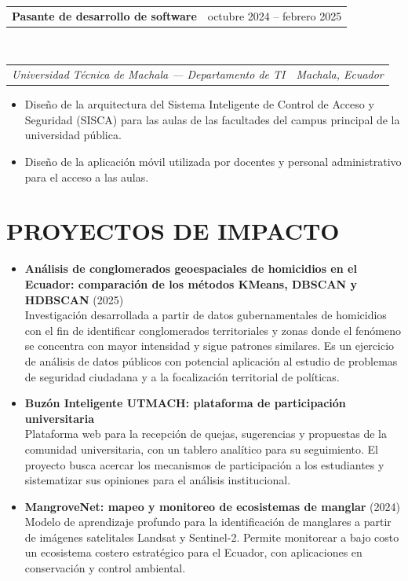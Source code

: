 \documentclass[letterpaper,10pt]{article}
\makeatletter
\newcommand{\fila}[2]{%
  \begin{tabular*}{\textwidth}{@{}l@{\extracolsep{\fill}}r@{}}
    #1 & #2 \\
  \end{tabular*}%
}
\newcommand{\entrada}[4]{%
  \fila{\textbf{#1}}{#2}\\[1pt]
  \fila{\textit{#3}}{\textit{#4}}\vspace{1pt}%
}
\newenvironment{vinetas}
  {\begin{itemize}[leftmargin=1.4em,label=$\bullet$,itemsep=0.5pt,topsep=1pt,parsep=0pt,partopsep=0pt]}
  {\end{itemize}\vspace{1pt}}
\makeatother
\begin{document}
\entrada{Pasante de desarrollo de software}{octubre 2024 -- febrero 2025}
        {Universidad Técnica de Machala --- Departamento de TI}{Machala, Ecuador}
\begin{vinetas}
  \item Diseño de la arquitectura del Sistema Inteligente de Control de
        Acceso y Seguridad (SISCA) para las aulas de las facultades del campus
        principal de la universidad pública.
  \item Diseño de la aplicación móvil utilizada por docentes y personal
        administrativo para el acceso a las aulas.
\end{vinetas}

\section*{PROYECTOS DE IMPACTO}

\begin{vinetas}
  \item \textbf{Análisis de conglomerados geoespaciales de homicidios en el
        Ecuador: comparación de los métodos KMeans, DBSCAN y HDBSCAN} (2025)\\
        Investigación desarrollada a partir de datos gubernamentales de
        homicidios con el fin de identificar conglomerados territoriales y
        zonas donde el fenómeno se concentra con mayor intensidad y sigue
        patrones similares. Es un ejercicio de análisis de datos públicos con
        potencial aplicación al estudio de problemas de seguridad ciudadana y
        a la focalización territorial de políticas.

  \item \textbf{Buzón Inteligente UTMACH: plataforma de participación
        universitaria}\\
        Plataforma web para la recepción de quejas, sugerencias y propuestas
        de la comunidad universitaria, con un tablero analítico para su
        seguimiento. El proyecto busca acercar los mecanismos de participación
        a los estudiantes y sistematizar sus opiniones para el análisis
        institucional.

  \item \textbf{MangroveNet: mapeo y monitoreo de ecosistemas de manglar}
        (2024)\\
        Modelo de aprendizaje profundo para la identificación de manglares a
        partir de imágenes satelitales Landsat y Sentinel-2. Permite
        monitorear a bajo costo un ecosistema costero estratégico para el
        Ecuador, con aplicaciones en conservación y control ambiental.
\end{vinetas}
\end{document}
